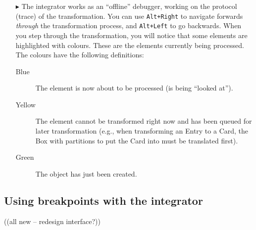 \begin{itemize}
\item[$\blacktriangleright$] The integrator works as an ``offline'' debugger, working on the protocol (trace) of the transformation. You can use
\texttt{Alt+Right} to navigate forwards \emph{through} the transformation process, and \texttt{Alt+Left} to go backwards.  When you step through the
transformation, you will notice that some elements are highlighted with colours. These are the elements currently being processed. The colours have the
following definitions:
\begin{description}
  \item[Blue] The element is now about to be processed (is being ``looked at'').
	\vspace{0.25cm}
  \item[Yellow] The element cannot be transformed right now and has been queued for later transformation 
  (e.g., when transforming an Entry to a Card, the Box with partitions to put the 
  Card into must be translated first).
	\vspace{0.25cm}
  \item[Green] The object has just been created.
\end{description}

\end{itemize}

\subsection{Using breakpoints with the integrator}

((all new -- redesign interface?))
